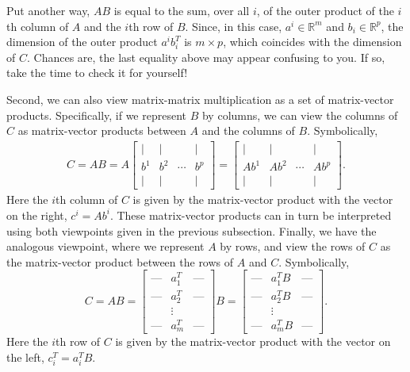 \documentclass[12pt]{article}
\begin{document}
Put another way, $AB$ is equal to the sum, over all $i$, of the outer
product of the $i$th 
column of $A$ and the $i$th row of $B$.  Since, in this case, $a^i \in
\mathbb{R}^m$ and $b_i \in \mathbb{R}^p$, the dimension of the
outer product $a^i b^T_i$ is $m \times p$, which coincides with the
dimension of $C$.  Chances are, the last equality above may appear 
confusing to you.  If so, take the time to check it for yourself!

Second, we can also view matrix-matrix multiplication as a set of
matrix-vector products. Specifically, if we represent $B$ by columns,
we can view the columns of $C$ as matrix-vector products between $A$
and the columns of $B$.  Symbolically,
\begin{align}
C = AB = A \left [ \begin{array}{cccc} | & | &  & | \\ b^1 & b^2 &
    \cdots & b^p \\ | & | &  & | \end{array} \right ] = \left [
    \begin{array}{cccc} | & | &  & | \\ A b^1 & A b^2 & \cdots & A b^p \\ |
      & | &  & | \end{array} \right ]. \label{eqn:1}
\end{align}
Here the $i$th column of $C$ is given by the matrix-vector product
with the vector on the right, $c^{i} = A b^{i}$.  These matrix-vector
products can in turn be interpreted using both viewpoints given in the
previous subsection.  Finally, we have the analogous viewpoint, where
we represent $A$ by rows, and view the rows of $C$ as the
matrix-vector product between the rows of $A$ and $C$.  Symbolically,
\[C = AB = \left [ \begin{array}{ccc} \mbox{---} & a^T_1 & 
  \mbox{---} \\   \mbox{---} & a^T_2 &  \mbox{---} \\ & \vdots & \\
  \mbox{---} & a^T_m  &  \mbox{---} \end{array} \right ] B = \left [
  \begin{array}{ccc} \mbox{---} & a^T_1 B &  \mbox{---} \\   \mbox{---}
  & a^T_2 B &  \mbox{---} \\ & \vdots & \\ 
  \mbox{---} & a^T_m B  &  \mbox{---} \end{array} \right ]. \]
Here the $i$th row of $C$ is given by the matrix-vector product with
the vector on the left, $c_i^T = a_i^T B$.
\end{document}
